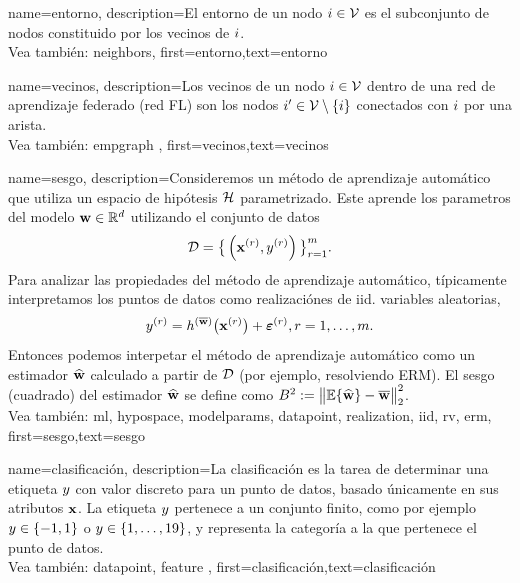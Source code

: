 {
	name={entorno},
	description={El entorno de un nodo $i \in \mathcal{V}$ es 
	el subconjunto de nodos constituido por los vecinos de $i$.
	\\
		Vea también: \gls{neighbors}},
	first={entorno},text={entorno} 
}

{
	name={vecinos},
	description={Los vecinos de un nodo $i \in \mathcal{V}$ 
	dentro de una red de aprendizaje federado (red FL) son los nodos $i' \in \mathcal{V} \setminus \{ i\}$ conectados con $i$ por una arista.
	\\
	Vea también: \gls{empgraph} },
	first={vecinos},text={vecinos} 
}

{
	name={sesgo},
	description={Consideremos un método de aprendizaje automático que utiliza un espacio de hipótesis $\mathcal{H}$ parametrizado. 
		Este aprende los parametros del modelo ${\bf w} \in \mathbb{R}^{d}$ utilizando el conjunto de datos $$ \mathcal{D}=\big\{ \left( {\bf x}^{(r)},y^{(r)} \right) \big\}_{r=1}^{m}.$$ 
		Para analizar las propiedades del método de aprendizaje automático, típicamente interpretamos los puntos de datos como realizaciónes
		de iid. variables aleatorias, $$ y^{(r)} = h^{(\overline{{\bf w}})}\big( {\bf x}^{(r)} \big) + \bm{\varepsilon}^{(r)}, r=1,\ldots,m.$$ 
		Entonces podemos interpetar el método de aprendizaje automático como un estimador $\widehat{{\bf w}}$ 
		calculado a partir de $\mathcal{D}$ (por ejemplo, resolviendo ERM). El sesgo (cuadrado) del estimador $\widehat{{\bf w}}$ 
		se define como $B^{2} := \big\| \mathbb{E} \{ \widehat{{\bf w}}  \}- \overline{{\bf w}}\big\|_{2}^{2}$. 
		\\
		Vea también: \gls{ml}, \gls{hypospace}, \gls{modelparams}, \gls{datapoint}, \gls{realization}, \gls{iid}, \gls{rv}, \gls{erm}},
		first={sesgo},text={sesgo} 
}

{name={clasificación},
description={La clasificación es la tarea de determinar una
	etiqueta $y$  con valor discreto para un punto de datos, basado únicamente en sus 
	atributos ${\bf x}$. La etiqueta $y$ pertenece a un conjunto finito, como por ejemplo 
	$y \in \{-1,1\}$ o $y \in \{1,\ldots,19\}$, y representa la 
	categoría a la que pertenece el punto de datos.
	\\
		Vea también: \gls{datapoint}, \gls{feature} },
	first={clasificación},text={clasificación} 
}


